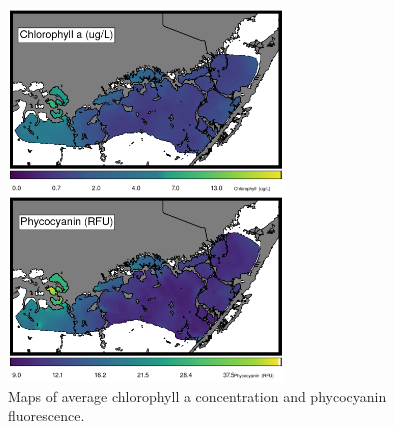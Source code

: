 \newpage



\begin{figure}
  \centering
  \includegraphics[width=0.65\textwidth]{../../figures/avmap.png}
  \caption{Maps of average chlorophyll a concentration and phycocyanin fluorescence.}
  \label{fig:7}
\end{figure}



